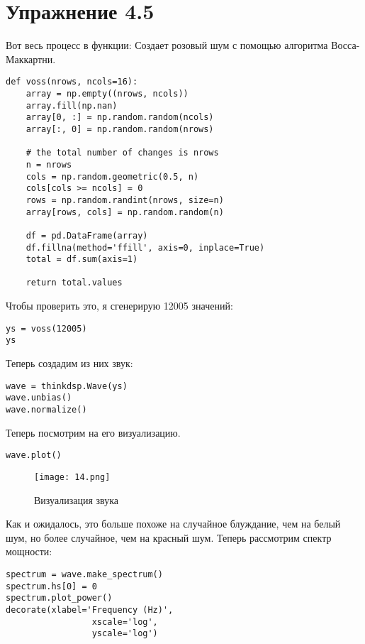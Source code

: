 \documentclass[a4paper,12pt]{report}
\begin{document}
\chapter{Упражнение 4.5}

Вот весь процесс в функции: Создает розовый шум с помощью алгоритма Восса-Маккартни.

\begin{lstlisting}[caption=Создание функции]
def voss(nrows, ncols=16):
    array = np.empty((nrows, ncols))
    array.fill(np.nan)
    array[0, :] = np.random.random(ncols)
    array[:, 0] = np.random.random(nrows)
    
    # the total number of changes is nrows
    n = nrows
    cols = np.random.geometric(0.5, n)
    cols[cols >= ncols] = 0
    rows = np.random.randint(nrows, size=n)
    array[rows, cols] = np.random.random(n)

    df = pd.DataFrame(array)
    df.fillna(method='ffill', axis=0, inplace=True)
    total = df.sum(axis=1)

    return total.values
\end{lstlisting}

Чтобы проверить это, я сгенерирую 12005 значений:

\begin{lstlisting}[caption=Генерация значений]
ys = voss(12005)
ys
\end{lstlisting}

Теперь создадим из них звук:

\begin{lstlisting}[caption=Создание звука]
wave = thinkdsp.Wave(ys)
wave.unbias()
wave.normalize()
\end{lstlisting}

Теперь посмотрим на его визуализацию.

\begin{lstlisting}[caption=Визуализация звука]
wave.plot()
\end{lstlisting}

\begin{figure}[H]
        \centering
        \texttt{[image: 14.png]}
        \caption{Визуализация звука}
        \label{fig:lab4_fig5_1}
\end{figure}

Как и ожидалось, это больше похоже на случайное блуждание, чем на белый шум, но более случайное, чем на красный шум. Теперь рассмотрим спектр мощности:

\begin{lstlisting}[caption=Спектр мощности звука]
spectrum = wave.make_spectrum()
spectrum.hs[0] = 0
spectrum.plot_power()
decorate(xlabel='Frequency (Hz)',
                 xscale='log', 
                 yscale='log')
\end{lstlisting}
\end{document}
